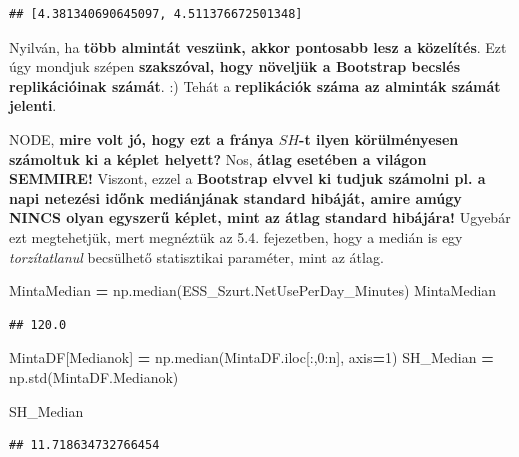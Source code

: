 \documentclass[
]{book}
\newenvironment{Shaded}{\begin{snugshade}}{\end{snugshade}}
\newcommand{\DecValTok}[1]{\textcolor[rgb]{0.00,0.00,0.81}{#1}}
\newcommand{\NormalTok}[1]{#1}
\newcommand{\OperatorTok}[1]{\textcolor[rgb]{0.81,0.36,0.00}{\textbf{#1}}}
\newcommand{\StringTok}[1]{\textcolor[rgb]{0.31,0.60,0.02}{#1}}
\begin{document}
\begin{Shaded}
\begin{Highlighting}[]
\NormalTok{[SH\_Keplet, SH\_Bootstrap]}
\end{Highlighting}
\end{Shaded}

\begin{verbatim}
## [4.381340690645097, 4.511376672501348]
\end{verbatim}

Nyilván, ha \textbf{több almintát veszünk, akkor pontosabb lesz a közelítés}. Ezt úgy mondjuk szépen \textbf{szakszóval, hogy növeljük a Bootstrap becslés replikációinak számát}. :) Tehát a \textbf{replikációk száma az alminták számát jelenti}.

NODE, \textbf{mire volt jó, hogy ezt a fránya \(SH\)-t ilyen körülményesen számoltuk ki a képlet helyett?} Nos, \textbf{átlag esetében a világon SEMMIRE!}
Viszont, ezzel a \textbf{Bootstrap elvvel ki tudjuk számolni pl. a napi netezési időnk mediánjának standard hibáját, amire amúgy NINCS olyan egyszerű képlet, mint az átlag standard hibájára!}
Ugyebár ezt megtehetjük, mert megnéztük az 5.4. fejezetben, hogy a medián is egy \emph{torzítatlanul} becsülhető statisztikai paraméter, mint az átlag.

\begin{Shaded}
\begin{Highlighting}[]
\NormalTok{MintaMedian }\OperatorTok{=}\NormalTok{ np.median(ESS\_Szurt.NetUsePerDay\_Minutes)}
\NormalTok{MintaMedian}
\end{Highlighting}
\end{Shaded}

\begin{verbatim}
## 120.0
\end{verbatim}

\begin{Shaded}
\begin{Highlighting}[]
\NormalTok{MintaDF[}\StringTok{\textquotesingle{}Medianok\textquotesingle{}}\NormalTok{] }\OperatorTok{=}\NormalTok{ np.median(MintaDF.iloc[:,}\DecValTok{0}\NormalTok{:n], axis}\OperatorTok{=}\DecValTok{1}\NormalTok{)}
\NormalTok{SH\_Median }\OperatorTok{=}\NormalTok{ np.std(MintaDF.Medianok)}

\NormalTok{SH\_Median}
\end{Highlighting}
\end{Shaded}

\begin{verbatim}
## 11.718634732766454
\end{verbatim}
\end{document}
